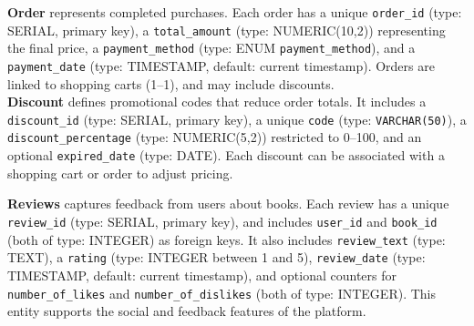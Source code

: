 \textbf{Order} represents completed purchases. Each order has a unique \texttt{order\_id} (type: SERIAL, primary key), a \texttt{total\_amount} (type: NUMERIC(10,2)) representing the final price, a \texttt{payment\_method} (type: ENUM \texttt{payment\_method}), and a \texttt{payment\_date} (type: TIMESTAMP, default: current timestamp). Orders are linked to shopping carts (1–1), and may include discounts.\\

\textbf{Discount} defines promotional codes that reduce order totals. It includes a \texttt{discount\_id} (type: SERIAL, primary key), a unique \texttt{code} (type: \texttt{VARCHAR(50)}), a \texttt{discount\_percentage} (type: NUMERIC(5,2)) restricted to 0–100, and an optional \texttt{expired\_date} (type: DATE). Each discount can be associated with a shopping cart or order to adjust pricing.

\textbf{Reviews} captures feedback from users about books. Each review has a unique \texttt{review\_id} (type: SERIAL, primary key), and includes \texttt{user\_id} and \texttt{book\_id} (both of type: INTEGER) as foreign keys. It also includes \texttt{review\_text} (type: TEXT), a \texttt{rating} (type: INTEGER between 1 and 5), \texttt{review\_date} (type: TIMESTAMP, default: current timestamp), and optional counters for \texttt{number\_of\_likes} and \texttt{number\_of\_dislikes} (both of type: INTEGER). This entity supports the social and feedback features of the platform.